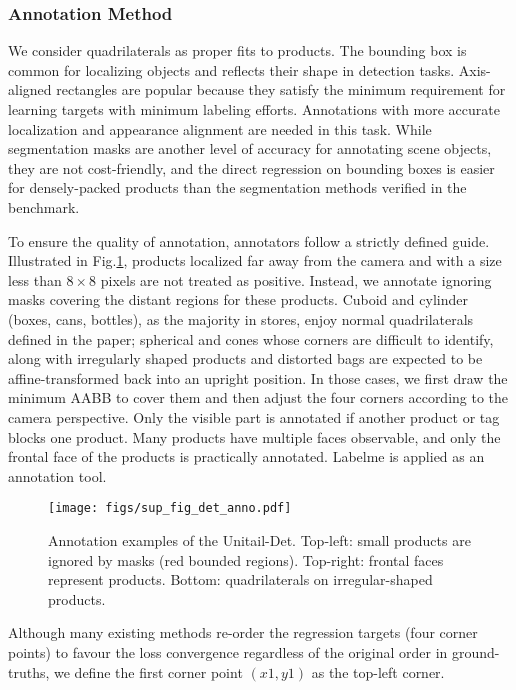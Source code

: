 \documentclass[runningheads]{llncs}
\begin{document}
\subsubsection{Annotation Method}
We consider quadrilaterals as proper fits to products. The bounding box is common for localizing objects and reflects their shape in detection tasks. Axis-aligned rectangles are popular because they satisfy the minimum requirement for learning targets with minimum labeling efforts. Annotations with more accurate localization and appearance alignment are needed in this task. While segmentation masks are another level of accuracy for annotating scene objects, they are not cost-friendly, and the direct regression on bounding boxes is easier for densely-packed products than the segmentation methods verified in the benchmark. 

To ensure the quality of annotation, annotators follow a strictly defined guide. Illustrated in Fig.\ref{fig:det_anno_examples}, products localized far away from the camera and with a size less than $8 \times 8$ pixels are not treated as positive. Instead, we annotate ignoring masks covering the distant regions for these products. Cuboid and cylinder (boxes, cans, bottles), as the majority in stores, enjoy normal quadrilaterals defined in the paper; spherical and cones whose corners are difficult to identify, along with irregularly shaped products and distorted bags are expected to be affine-transformed back into an upright position. In those cases, we first draw the minimum AABB to cover them and then adjust the four corners according to the camera perspective. Only the visible part is annotated if another product or tag blocks one product. Many products have multiple faces observable, and only the frontal face of the products is practically annotated. Labelme \cite{wada2018labelme} is applied as an annotation tool.


\begin{figure}[t]
    \centering
    \texttt{[image: figs/sup\_fig\_det\_anno.pdf]}
    \caption{Annotation examples of the Unitail-Det. Top-left: small products are ignored by masks (red bounded regions). Top-right: frontal faces represent products. Bottom: quadrilaterals on irregular-shaped products.}
    \label{fig:det_anno_examples}
\end{figure}

Although many existing methods \cite{RIDet,RSDet,EAST} re-order the regression targets (four corner points) to favour the loss convergence regardless of the original order in ground-truths, we define the first corner point $(x1, y1)$ as the top-left corner.
\end{document}
